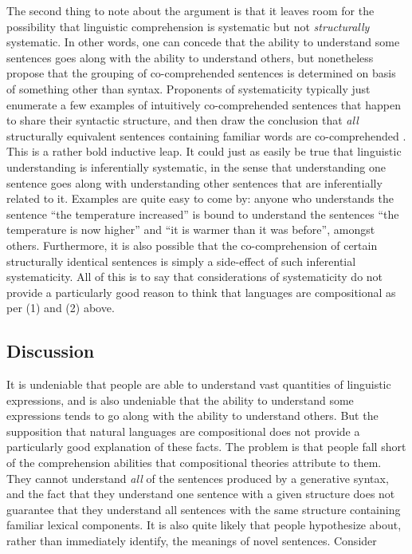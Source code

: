 The second thing to note about the argument is that it leaves room for the possibility that linguistic comprehension is systematic but not \textit{structurally} systematic. In other words, one can concede that the ability to understand some sentences goes along with the ability to understand others, but nonetheless propose that the grouping of co-comprehended sentences is determined on basis of something other than syntax. Proponents of systematicity typically just enumerate a few examples of intuitively co-comprehended sentences that happen to share their syntactic structure, and then draw the conclusion that \textit{all} structurally equivalent sentences containing familiar words are co-comprehended \citep[e.g.,][]{FodorPylyshyn:1988}. This is a rather bold inductive leap. It could just as easily be true that linguistic understanding is inferentially systematic, in the sense that understanding one sentence goes along with understanding other sentences that are inferentially related to it. Examples are quite easy to come by: anyone who understands the sentence ``the temperature increased'' is bound to understand the sentences ``the temperature is now higher'' and ``it is warmer than it was before'', amongst others. Furthermore, it is also possible that the co-comprehension of certain structurally identical sentences is simply a side-effect of such inferential systematicity. All of this is to say that considerations of systematicity do not provide a particularly good reason to think that languages are compositional as per (1) and (2) above. 

\subsection{Discussion}

It is undeniable that people are able to understand vast quantities of linguistic expressions, and is also undeniable that the ability to understand some expressions tends to go along with the ability to understand others. But the supposition that natural languages are compositional does not provide a particularly good explanation of these facts. The problem is that people fall short of the comprehension abilities that compositional theories attribute to them. They cannot understand \textit{all} of the sentences produced by a generative syntax, and the fact that they understand one sentence with a given structure does not guarantee that they understand all sentences with the same structure containing familiar lexical components. It is also quite likely that people hypothesize about, rather than immediately identify, the meanings of novel sentences. Consider


